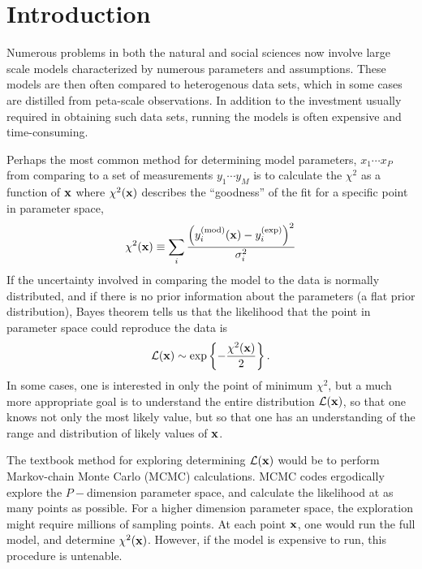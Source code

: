 \section{Introduction}

Numerous problems in both the natural and social sciences now involve large scale models characterized by numerous parameters and assumptions. These models are then often compared to heterogenous data sets, which in some cases are distilled from peta-scale observations. In addition to the investment usually required in obtaining such data sets, running the models is often expensive and time-consuming. 

Perhaps the most common method for determining model parameters, $x_1\cdots x_P$ from comparing to a set of measurements $y_1\cdots y_M$ is to calculate the $\chi^2$ as a function of ${\bf x}$ where $\chi^2({\bf x})$ describes the ``goodness'' of the fit for a specific point in parameter space,
\begin{equation}
\chi^2({\bf x})\equiv
\sum_i \frac{\left(y_i^{\rm(mod)}({\bf x})-y_i^{\rm(exp)}\right)^2}{\sigma_i^2}
\end{equation}
If the uncertainty involved in comparing the model to the data is normally distributed, and if there is no prior information about the parameters (a flat prior distribution), Bayes theorem tells us that the likelihood that the point in parameter space could reproduce the data is
\begin{equation}
\mathcal{L}({\bf x})\sim \exp\left\{-\frac{\chi^2({\bf x})}{2}\right\}.
\end{equation}
In some cases, one is interested in only the point of minimum $\chi^2$, but a much more appropriate goal is to understand the entire distribution $\mathcal{L}({\bf x})$, so that one knows not only the most likely value, but so that one has an understanding of the range and distribution of likely values of ${\bf x}$. 

The textbook method for exploring determining $\mathcal{L}({\bf x})$ would be to perform Markov-chain Monte Carlo (MCMC) calculations. MCMC codes ergodically explore the $P-$dimension parameter space, and calculate the likelihood at as many points as possible. For a higher dimension parameter space, the exploration might require millions of sampling points. At each point ${\bf x}$, one would run the full model, and determine $\chi^2({\bf x})$. However, if the model is expensive to run, this procedure is untenable.

